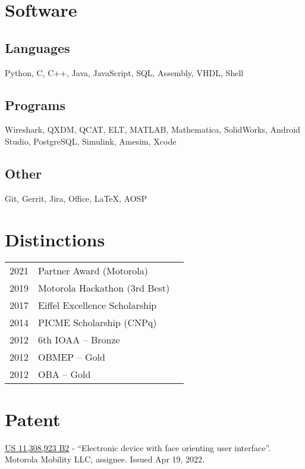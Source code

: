 \documentclass[]{deedy-resume}
\begin{document}
\begin{minipage}[t]{0.33\textwidth}
\vspace{+1ex}

\section{Software}

\subsection{Languages}
Python, C, C++, Java, JavaScript, 
SQL, Assembly, VHDL, Shell 
\sectionsep

\subsection{Programs}
Wireshark, QXDM, QCAT, ELT, MATLAB, 
Mathematica, SolidWorks, Android Studio,
PostgreSQL, Simulink, Amesim, Xcode
\sectionsep

\subsection{Other}
Git, Gerrit, Jira, Office, LaTeX, AOSP

\vspace{+2ex}
\section{Distinctions} 
\begin{tabular}{rll}
2021         & Partner Award (Motorola)\\
2019         & Motorola Hackathon (3rd Best)\\
2017	     & Eiffel Excellence Scholarship\\
2014         & PICME Scholarship (CNPq)\\
2012	     & 6th IOAA -- Bronze\\
2012	     & OBMEP -- Gold\\
2012	     & OBA -- Gold \\
\end{tabular}
\sectionsep

\section{Patent}
\href{https://patents.google.com/patent/US11308923B2/}{US 11,308,923 B2} - ``Electronic device with face orienting user interface''. Motorola Mobility LLC, assignee. Issued Apr 19, 2022.
\sectionsep

%
%

\end{minipage} 
\end{document}
